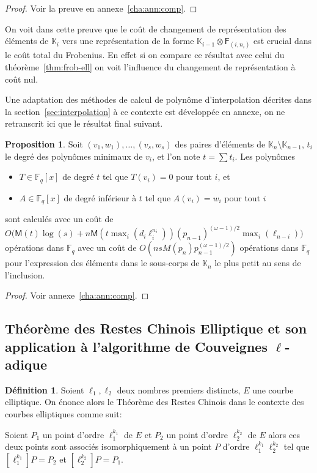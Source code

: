 \documentclass[10pt,a4paper]{book}
\theoremstyle{plain}
\theoremstyle{definition}
\theoremstyle{definition}
\theoremstyle{definition}
\newtheorem{prop}[thm]{Proposition}
\theoremstyle{definition}
\newtheorem{defi}[thm]{Définition}
\theoremstyle{remark}
\theoremstyle{remark}
\theoremstyle{definition}
\begin{document}
\begin{proof}
Voir la preuve en annexe~\ref{cha:ann:comp}.
\end{proof}


On voit dans cette preuve que le coût de changement de représentation des 
éléments de $\mathbb{K}_i$ vers une représentation de la forme 
$\mathbb{K}_{i-1} \otimes \mathsf{F}_{(i,n_i)}$ est crucial dans le coût total
du Frobenius. En effet si on compare ce résultat avec celui du 
théorème~\ref{thm:frob-ell} on voit l'influence du changement de représentation
à coût nul.

Une adaptation des méthodes de calcul de polynôme d'interpolation décrites dans
la section~\ref{sec:interpolation} à ce contexte est développée en annexe, on
ne retranscrit ici que le résultat final suivant.

\begin{prop}\label{prop:interpol:comp}
  Soit $(v_1,w_1),\dots,(v_s,w_s)$ des paires d'éléments de $\mathbb{K}_n 
  \setminus \mathbb{K}_{n-1}$, $t_i$ le degré des polynômes minimaux de $v_i$, 
  et l'on note  $t=\sum t_i$. 
  Les polynômes
  \begin{itemize}
  \item $T\in \mathbb{F}_q[x]$ de degré $t$ tel que $T(v_i)=0$ pour tout $i$,
    et
  \item $A\in \mathbb{F}_q[x]$ de degré inférieur à $t$ tel que $A(v_i)=w_i$ pour
    tout $i$
  \end{itemize}
  sont calculés avec un coût de
  $O\bigl(\mathsf{M}(t)\log(s) + n\mathsf{M}(t \max_i(d_i\ell_i^{n_i}))(p_{n-1})^{(\omega-1)/2} \max_{i}(\ell_{n-i})\bigr)$ 
  opérations dans $\mathbb{F}_q$ avec un coût de 
  $O(nsM(p_n)p_{n-1}^{(\omega-1)/2})$ opérations dans $\mathbb{F}_q$ pour 
  l'expression des éléments dans le sous-corps de $\mathbb{K}_n$ le plus petit 
  au sens de l'inclusion.
\end{prop}

\begin{proof}
Voir annexe~\ref{cha:ann:comp}.
\end{proof}

\subsection{Théorème des Restes Chinois Elliptique et son application à l'algorithme de Couveignes $\ell$-adique}
\label{sub:TRCE:cou}
\begin{defi}
Soient $\ell_1, \ell_2$ deux nombres premiers distincts, $E$ une courbe 
elliptique. On énonce alors le Théorème des Restes Chinois dans le contexte des
courbes elliptiques comme suit:

Soient $P_1$ un point d'ordre $\ell_1^{k_1}$ de $E$ et $P_2$ un point d'ordre $\ell_2^{k_2}$ de $E$ alors ces deux points sont associés isomorphiquement à un point $P$ d'ordre $\ell_1^{k_1}\ell_2^{k_2}$ tel que $[\ell_1^{k_1}]P=P_2$ et $[\ell_2^{k_2}]P=P_1$.
\end{defi}
\end{document}
